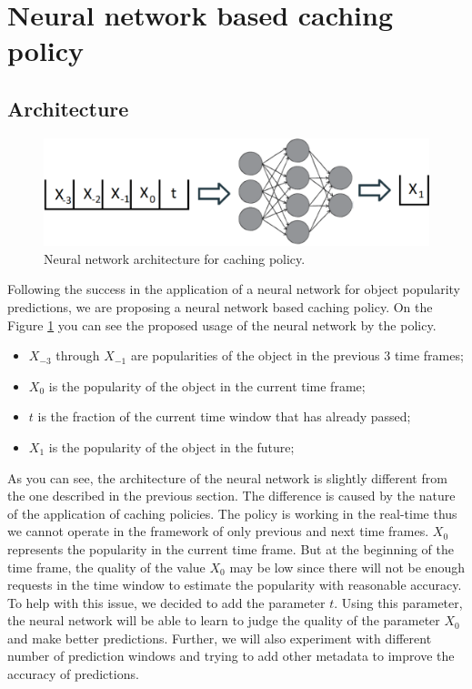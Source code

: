 \section{Neural network based caching policy}

\subsection{Architecture}

\begin{figure}[b!]
	\centering
	\includegraphics[width=\linewidth]{pics/cache1.png}
	\caption{Neural network architecture for caching policy.}
	\label{fig:cache1}
\end{figure}

Following the success in the application of a neural network for object popularity predictions, we are proposing a neural network based caching policy. On the Figure \ref{fig:cache1} you can see the proposed usage of the neural network by the policy.

\begin{itemize}
	\item $X_{-3}$ through $X_{-1}$ are popularities of the object in the previous 3 time frames;
	\item $X_0$ is the popularity of the object in the current time frame;
	\item $t$ is the fraction of the current time window that has already passed;
	\item $X_1$ is the popularity of the object in the future;
\end{itemize}

As you can see, the architecture of the neural network is slightly different from the one described in the previous section.  The difference is caused by the nature of the application of caching policies. The policy is working in the real-time thus we cannot operate in the framework of only previous and next time frames. $X_0$ represents the popularity in the current time frame. But at the beginning of the time frame, the quality of the value $X_0$ may be low since there will not be enough requests in the time window to estimate the popularity with reasonable accuracy. To help with this issue, we decided to add the parameter $t$. Using this parameter, the neural network will be able to learn to judge the quality of the parameter $X_0$ and make better predictions. Further, we will also experiment with different number of prediction windows and trying to add other metadata to improve the accuracy of predictions.

